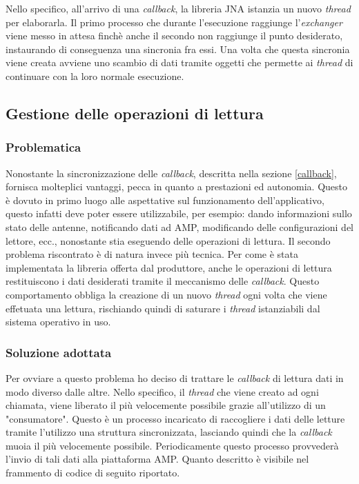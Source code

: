 Nello specifico, all'arrivo di una \emph{callback}, la libreria JNA istanzia un nuovo \emph{thread} per elaborarla. 
Il primo processo che durante l'esecuzione raggiunge l'\emph{exchanger} viene messo in attesa finchè anche il secondo non
raggiunge il punto desiderato, instaurando di conseguenza una sincronia fra essi. Una volta che questa sincronia viene
creata avviene uno scambio di dati tramite oggetti che permette ai \emph{thread} di continuare con la loro normale
esecuzione.

\subsection{Gestione delle operazioni di lettura}
\subsubsection*{Problematica}
Nonostante la sincronizzazione delle \emph{callback}, descritta nella sezione \ref{callback}, fornisca molteplici
vantaggi, pecca in quanto a prestazioni ed autonomia. Questo è dovuto in primo luogo alle aspettative sul funzionamento
dell'applicativo, questo infatti deve poter essere utilizzabile, per esempio: dando informazioni sullo stato delle antenne, notificando
dati ad AMP, modificando delle configurazioni del lettore, ecc., nonostante stia eseguendo delle operazioni di lettura.
Il secondo problema riscontrato è di natura invece più tecnica. Per come è stata implementata la libreria offerta dal produttore,
anche le operazioni di lettura restituiscono i dati desiderati tramite il meccanismo delle \emph{callback}. 
Questo comportamento obbliga la creazione di un nuovo \emph{thread} ogni volta che viene effetuata una lettura, rischiando quindi di saturare 
i \emph{thread} istanziabili dal sistema operativo in uso.

\subsubsection*{Soluzione adottata}
Per ovviare a questo problema ho deciso di trattare le \emph{callback} di lettura dati in modo diverso dalle altre. 
Nello specifico, il \emph{thread} che viene creato ad ogni chiamata, viene liberato il più velocemente possibile grazie all'utilizzo di un
"consumatore". Questo è un processo incaricato di raccogliere i dati delle letture tramite l'utilizzo una struttura sincronizzata, 
lasciando quindi che la \emph{callback} muoia il più velocemente possibile. Periodicamente questo processo provvederà l'invio di tali dati alla piattaforma AMP. 
Quanto descritto è visibile nel frammento di codice di seguito riportato.

